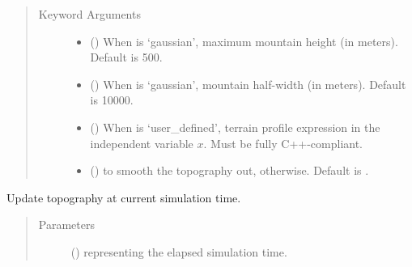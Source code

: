 \documentclass[letterpaper,10pt,english]{sphinxmanual}
\begin{document}
\begin{fulllineitems}
\begin{fulllineitems}
\begin{quote}
\begin{description}
\item[{Keyword Arguments}] \leavevmode\begin{itemize}
\item {} 
 () \textendash{} When  is ‘gaussian’, maximum mountain height (in meters). Default is 500.

\item {} 
 () \textendash{} When  is ‘gaussian’, mountain half-width (in meters). Default is 10000.

\item {} 
 () \textendash{} When  is ‘user\_defined’, terrain profile expression in the independent variable \(x\).
Must be fully C++-compliant.

\item {} 
 () \textendash{}  to smooth the topography out,  otherwise. Default is .

\end{itemize}

\end{description}\end{quote}

\end{fulllineitems}


\begin{fulllineitems}
\label{\detokenize{api:grids.topography.Topography1d.update}}
Update topography at current simulation time.
\begin{quote}\begin{description}
\item[{Parameters}] \leavevmode
{} () \textendash{}  representing the elapsed simulation time.

\end{description}\end{quote}

\end{fulllineitems}


\end{fulllineitems}
\end{document}

